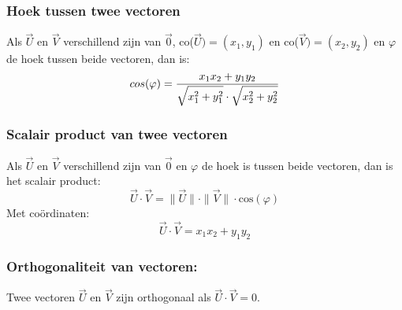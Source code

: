 \subsubsection{Hoek tussen twee vectoren} \label{hoek_vectoren}
\hypertarget{hoek_vectoren}{}

Als $\vec{U}$ en $\vec{V}$ verschillend zijn van $\vec{0}$, co($\vec{U})=(x_1, y_1)$ en co($\vec{V})=(x_2, y_2)$ en $\varphi$ de hoek tussen beide vectoren, dan is: 
\[cos(\varphi)=\displaystyle\frac{\displaystyle x_1x_2+y_1y_2}{\displaystyle \sqrt{x_1^2+y_1^2}\cdot\sqrt{x_2^2+y_2^2}}\]

\subsubsection{Scalair product van twee vectoren} \label{scalair_product_vectoren}
\hypertarget{scalair_product_vectoren}{}
Als $\vec{U}$ en $\vec{V}$ verschillend zijn van $\vec{0}$ en $\varphi$ de hoek is tussen beide vectoren, dan is het scalair product:
\[\vec{U}\cdot \vec{V} = \|\vec{U}\|\cdot\|\vec{V}\|\cdot \mbox{cos}(\varphi)\]
Met co\"ordinaten: 
\[\vec{U}\cdot\vec{V}=x_1x_2+y_1y_2\]

\subsubsection{Orthogonaliteit van vectoren:} \label{orthogonaliteit_vectoren}
\hypertarget{orthogonaliteit_vectoren}{}
Twee vectoren $\vec{U}$ en $\vec{V}$ zijn orthogonaal als $\vec{U}\cdot \vec{V}=0$.



